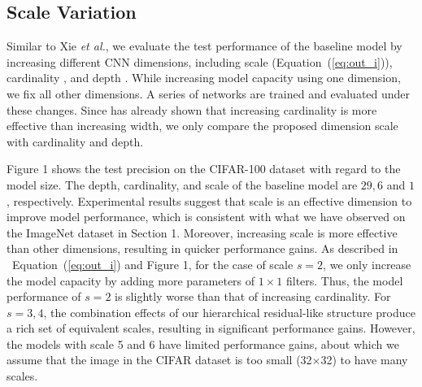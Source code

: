 \documentclass[10pt,journal,cspaper,compsoc]{IEEEtran}
\newcommand{\CheckRmv}[1]{}
\newcommand{\figref}[1]{Figure 1}%
\newcommand{\secref}[1]{Section 1}
\renewcommand{\eqref}[1]{Equation 1}
\newcommand{\CheckRmv}[1]{#1}
\newcommand{\figref}[1]{Fig.~\ref{#1}}%
\newcommand{\secref}[1]{Sec.~\ref{#1}}
\renewcommand{\eqref}[1]{Equation~(\ref{#1})}
\def\etal{{\em et al.}}
\def\etal{{\em et al.}}
\begin{document}
\subsection{Scale Variation}
\label{sec:compare_dimentions}

Similar to Xie \etal \cite{xie2017aggregated},
we evaluate the test performance of the baseline model by increasing
different CNN dimensions,
including scale (\eqref{eq:out_i}), cardinality \cite{xie2017aggregated},
and depth \cite{simonyan2014very}.
%
While increasing model capacity using one dimension,
we fix all other dimensions.
A series of networks are trained and evaluated under these changes.
%
Since \cite{xie2017aggregated} has already shown that increasing cardinality
is more effective than increasing width,
we only compare the proposed dimension scale with cardinality and depth.


\figref{fig:cmp_scale_card} shows the test precision on the CIFAR-100 dataset
with regard to the model size.
The depth, cardinality, and scale of the baseline model are
$29, 6$ and $1$, respectively.
%
Experimental results suggest that scale is an effective dimension
to improve model performance,
which is consistent with what we have observed on the ImageNet dataset
in \secref{sec:Experiments_ImageNet}.
Moreover, increasing scale is more effective than other dimensions,
resulting in quicker performance gains.
%
As described in ~\eqref{eq:out_i} and \figref{fig:structure},
for the case of scale $s=2$,
we only increase the model capacity by adding more parameters
of $1 \times 1$ filters.
Thus, the model performance of $s=2$ is slightly worse
than that of increasing cardinality.
%
For $s = 3,4$, the combination effects of our hierarchical residual-like
structure produce a rich set of equivalent scales,
resulting in significant performance gains.
%
However, the models with scale 5 and 6 have limited performance gains,
about which we assume that the image in the CIFAR dataset is too small (32$\times$32)
to have many scales.

\CheckRmv{
\begin{figure}[t]
  \centering
  \begin{overpic}[width=\linewidth]{cmp_scale_card.pdf}
    \put(22,21.5){2$s$} \put(39.5,31){3$s$} \put(54,48){4$s$}
    \put(66,47){5$s$} \put(80,51){6$s$}
    \put(30,20){12$c$} \put(43,25){18$c$} \put(56,31.5){24$c$}
    \put(70,32.5){30$c$} \put(84,33){36$c$}
    \put(29,14.5){56$d$} \put(44,12){83$d$} \put(58,13.5){110$d$}
    \put(73,13.5){137$d$} \put(87,19.5){164$d$}
    \put(14,10){29$d$-6$c$-1$s$} %
  \end{overpic}
  \caption{Test precision on the CIFAR-100 dataset with regard to the model size,
  	by changing cardinality (ResNeXt-29), depth (ResNeXt),
  	and scale (Res2Net-29).
  }\label{fig:cmp_scale_card}
\end{figure}
}
\end{document}
